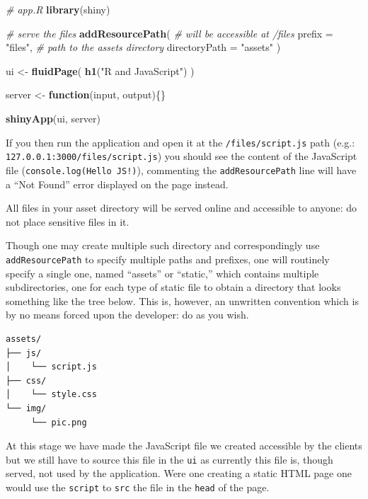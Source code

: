 \documentclass[
]{krantz}
\makeatletter
\newenvironment{Shaded}{\begin{snugshade}}{\end{snugshade}}
\newcommand{\CommentTok}[1]{\textcolor[rgb]{0.37,0.37,0.37}{\textit{#1}}}
\newcommand{\ControlFlowTok}[1]{\textcolor[rgb]{0.27,0.27,0.27}{\textbf{#1}}}
\newcommand{\DataTypeTok}[1]{\textcolor[rgb]{0.27,0.27,0.27}{#1}}
\newcommand{\KeywordTok}[1]{\textcolor[rgb]{0.27,0.27,0.27}{\textbf{#1}}}
\newcommand{\NormalTok}[1]{#1}
\newcommand{\StringTok}[1]{\textcolor[rgb]{0.5,0.5,0.5}{#1}}
\newenvironment{kframe}{%
\medskip{}
\setlength{\fboxsep}{.8em}
 \def\at@end@of@kframe{}%
 \ifinner\ifhmode%
  \def\at@end@of@kframe{\end{minipage}}%
  \begin{minipage}{\columnwidth}%
 \fi\fi%
 \def\FrameCommand##1{\hskip\@totalleftmargin \hskip-\fboxsep
 \colorbox{shadecolor}{##1}\hskip-\fboxsep
     \hskip-\linewidth \hskip-\@totalleftmargin \hskip\columnwidth}%
 \MakeFramed {\advance\hsize-\width
   \@totalleftmargin\z@ \linewidth\hsize
   \@setminipage}}%
 {\par\unskip\endMakeFramed%
 \at@end@of@kframe}
\renewenvironment{Shaded}{\begin{kframe}}{\end{kframe}}
\makeatother
\begin{document}
\begin{Shaded}
\begin{Highlighting}[]
\CommentTok{\# app.R}
\KeywordTok{library}\NormalTok{(shiny)}

\CommentTok{\# serve the files}
\KeywordTok{addResourcePath}\NormalTok{(}
  \CommentTok{\# will be accessible at /files}
  \DataTypeTok{prefix =} \StringTok{"files"}\NormalTok{, }
  \CommentTok{\# path to the assets directory}
  \DataTypeTok{directoryPath =} \StringTok{"assets"}
\NormalTok{)}

\NormalTok{ui <{-}}\StringTok{ }\KeywordTok{fluidPage}\NormalTok{(}
  \KeywordTok{h1}\NormalTok{(}\StringTok{"R and JavaScript"}\NormalTok{)}
\NormalTok{)}

\NormalTok{server <{-}}\StringTok{ }\ControlFlowTok{function}\NormalTok{(input, output)\{\}}

\KeywordTok{shinyApp}\NormalTok{(ui, server)}
\end{Highlighting}
\end{Shaded}

If you then run the application and open it at the \texttt{/files/script.js} path (e.g.: \texttt{127.0.0.1:3000/files/script.js}) you should see the content of the JavaScript file (\texttt{console.log(\textquotesingle{}Hello\ JS!\textquotesingle{})}), commenting the \texttt{addResourcePath} line will have a ``Not Found'' error displayed on the page instead.

All files in your asset directory will be served online and accessible to anyone: do not place sensitive files in it.

Though one may create multiple such directory and correspondingly use \texttt{addResourcePath} to specify multiple paths and prefixes, one will routinely specify a single one, named ``assets'' or ``static,'' which contains multiple subdirectories, one for each type of static file to obtain a directory that looks something like the tree below. This is, however, an unwritten convention which is by no means forced upon the developer: do as you wish.

\begin{verbatim}
assets/
├── js/
│    └── script.js
├── css/
│    └── style.css
└── img/
     └── pic.png
\end{verbatim}

At this stage we have made the JavaScript file we created accessible by the clients but we still have to source this file in the \texttt{ui} as currently this file is, though served, not used by the application. Were one creating a static HTML page one would use the \texttt{script} to \texttt{src} the file in the \texttt{head} of the page.
\end{document}
